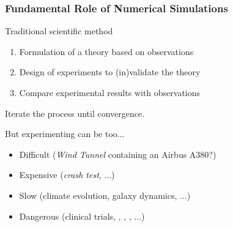 \documentclass[xcolor={x11names,svgnames,psnames}]{beamer}
\begin{document}

\begin{frame}
\frametitle{Fundamental Role of Numerical Simulations}

\begin{block}{Traditional scientific method}
  \begin{enumerate}
  \item Formulation of a theory based on observations
  \item Design of experiments to (in)validate the theory
  \item Compare experimental results with observations
  \end{enumerate}
\end{block}

Iterate the process until convergence.

\begin{alertblock}{But experimenting can be too...}
  \begin{itemize}
  \item Difficult (\emph{Wind Tunnel} containing an Airbus A380?)
  \item Expensive (\emph{crash test}, ...)
  \item Slow (climate evolution, galaxy dynamics, ...)
  \item Dangerous (clinical trials, \Biohazard, \Radioactivity, \Laserbeam, ...)
  \end{itemize}
\end{alertblock}
\end{frame}

\end{document}
